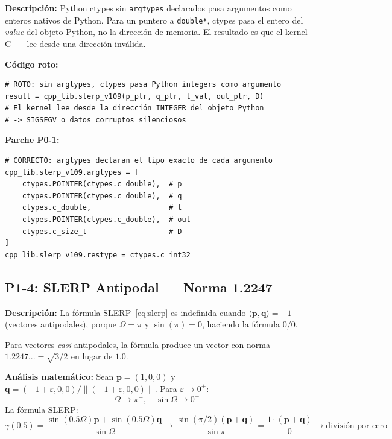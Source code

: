 \textbf{Descripción:} Python ctypes sin \texttt{argtypes} declarados pasa argumentos
como enteros nativos de Python. Para un puntero a \texttt{double*}, ctypes pasa
el entero del \textit{value} del objeto Python, no la dirección de memoria. El resultado
es que el kernel C++ lee desde una dirección inválida.

\textbf{Código roto:}
\begin{verbatim}
# ROTO: sin argtypes, ctypes pasa Python integers como argumento
result = cpp_lib.slerp_v109(p_ptr, q_ptr, t_val, out_ptr, D)
# El kernel lee desde la dirección INTEGER del objeto Python
# -> SIGSEGV o datos corruptos silenciosos
\end{verbatim}

\textbf{Parche P0-1:}
\begin{verbatim}
# CORRECTO: argtypes declaran el tipo exacto de cada argumento
cpp_lib.slerp_v109.argtypes = [
    ctypes.POINTER(ctypes.c_double),  # p
    ctypes.POINTER(ctypes.c_double),  # q
    ctypes.c_double,                  # t
    ctypes.POINTER(ctypes.c_double),  # out
    ctypes.c_size_t                   # D
]
cpp_lib.slerp_v109.restype = ctypes.c_int32
\end{verbatim}

\subsection{P1-4: SLERP Antipodal --- Norma 1.2247}

\textbf{Descripción:} La fórmula SLERP~\eqref{eq:slerp} es indefinida cuando
$\langle\mathbf{p}, \mathbf{q}\rangle = -1$ (vectores antipodales), porque
$\Omega = \pi$ y $\sin(\pi) = 0$, haciendo la fórmula $0/0$.

Para vectores \textit{casi} antipodales, la fórmula produce un vector con norma
$1.2247... = \sqrt{3/2}$ en lugar de $1.0$.

\textbf{Análisis matemático:}
Sean $\mathbf{p} = (1, 0, 0)$ y $\mathbf{q} = (-1+\varepsilon, 0, 0)/\|{(-1+\varepsilon,0,0)}\|$.
Para $\varepsilon \to 0^+$:
\begin{equation}
\Omega \to \pi^-, \quad \sin\Omega \to 0^+
\end{equation}
La fórmula SLERP:
\begin{equation}
\gamma(0.5) = \frac{\sin(0.5\Omega)\mathbf{p} + \sin(0.5\Omega)\mathbf{q}}{\sin\Omega}
\to \frac{\sin(\pi/2)(\mathbf{p} + \mathbf{q})}{\sin\pi}
= \frac{1 \cdot (\mathbf{p} + \mathbf{q})}{0} \to \text{división por cero}
\end{equation}

